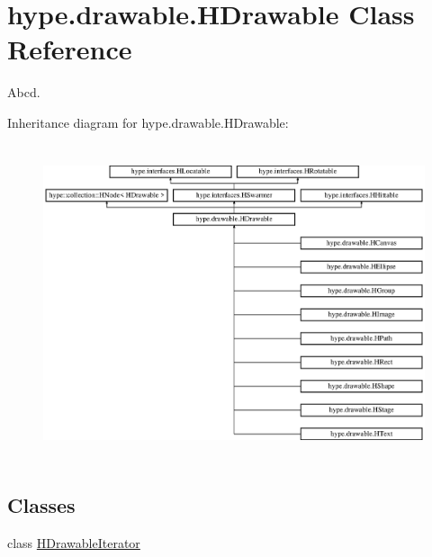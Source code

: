 \hypertarget{classhype_1_1drawable_1_1_h_drawable}{\section{hype.\-drawable.\-H\-Drawable Class Reference}
\label{classhype_1_1drawable_1_1_h_drawable}
}


Abcd.  


Inheritance diagram for hype.\-drawable.\-H\-Drawable\-:\begin{figure}[H]
\begin{center}
\leavevmode
\includegraphics[height=9.333334cm]{classhype_1_1drawable_1_1_h_drawable}
\end{center}
\end{figure}
\subsection*{Classes}
\begin{DoxyCompactItemize}
\item 
class \hyperlink{classhype_1_1drawable_1_1_h_drawable_1_1_h_drawable_iterator}{H\-Drawable\-Iterator}
\end{DoxyCompactItemize}
